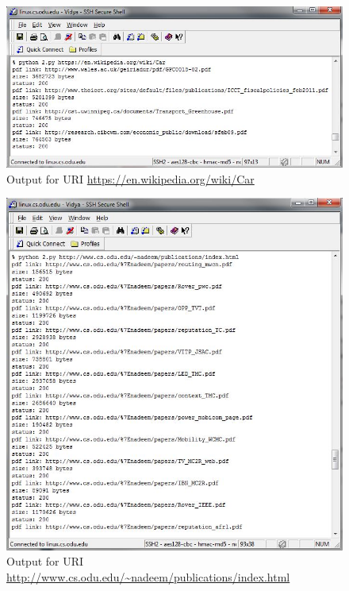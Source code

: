 \begin{figure}[h!]
\begin{center}
\includegraphics[scale=0.55, keepaspectratio=true]{figures/URI1.JPG}
\caption{Output for URI \url {https://en.wikipedia.org/wiki/Car}}
\label{mcpon_navy_mil}
\end{center}
\end{figure}


\begin{figure}[h!]
\begin{center}
\includegraphics[scale=0.55, keepaspectratio=true]{figures/URI2.JPG}
\caption{Output for URI \url {http://www.cs.odu.edu/~nadeem/publications/index.html}}
\label{mcpon_navy_mil}
\end{center}
\end{figure}


